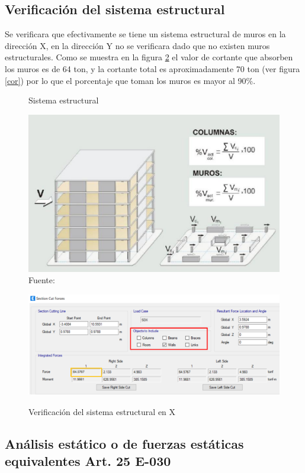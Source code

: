 \documentclass[12pt]{article}
\begin{document}
\subsection{Verificación del sistema estructural}
Se verificara que efectivamente se tiene un sistema estructural de muros en la dirección X, en la dirección Y no se verificara dado que no existen muros estructurales. Como se muestra en la figura \ref{ver} el valor de cortante que absorben los muros es de 64 ton, y la cortante total es aproximadamente 70 ton (ver figura \ref{cor}) por lo que el porcentaje que toman los muros es mayor al 90\%.
\begin{figure}[h!]
    \centering
    \caption{Sistema estructural}
    \includegraphics[scale=0.7]{IMAGENES/18.PNG}
    \caption*{\small Fuente: \it \cite{comen}}
    \label{fig:my_label}
\end{figure}
\newpage
\begin{figure}[h!]
    \centering
    \caption{Verificación del sistema estructural en X}
    \includegraphics[scale=0.58]{IMAGENES/21.PNG}
    \label{ver}
\end{figure}

\subsection{Análisis estático o de fuerzas estáticas equivalentes Art. 25 E-030}
\end{document}
